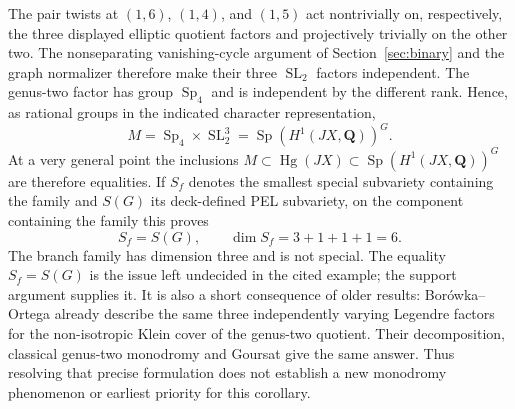 \documentclass[11pt]{article}
\theoremstyle{definition}
\newcommand{\Q}{\mathbf Q}
\newcommand{\SL}{\operatorname{SL}}
\newcommand{\Sp}{\operatorname{Sp}}
\begin{document}
The pair twists at $(1,6)$, $(1,4)$, and $(1,5)$ act nontrivially on,
respectively, the three displayed elliptic quotient factors and
projectively trivially on the other two. The nonseparating vanishing-cycle
argument of Section~\ref{sec:binary} and the graph normalizer therefore
make their three $\SL_2$ factors independent. The genus-two factor has
group $\Sp_4$ and is independent by the different rank. Hence, as
rational groups in the indicated character representation,
\[
 M=\Sp_4\times\SL_2^3
       =\Sp(H^1(JX,\Q))^G.
\]
At a very general point the inclusions
$M\subset\operatorname{Hg}(JX)\subset\Sp(H^1(JX,\Q))^G$
are therefore equalities. If $S_f$ denotes the smallest special
subvariety containing the family and $S(G)$ its deck-defined PEL
subvariety, on the component containing the family this proves
\[
                         S_f=S(G),\qquad\dim S_f=3+1+1+1=6.
\]
The branch family has dimension three and is not special.
The equality $S_f=S(G)$ is the issue left undecided in the cited
example; the support argument supplies it. It is also a short consequence
of older results: Bor\'owka--Ortega \cite[Remark 3.5, Proposition 3.9]{BO}
already describe the same three independently varying Legendre factors
for the non-isotropic Klein cover of the genus-two quotient. Their
decomposition, classical genus-two monodromy and Goursat give the same
answer. Thus resolving that precise formulation does not establish a new
monodromy phenomenon or earliest priority for this corollary.
\end{document}
